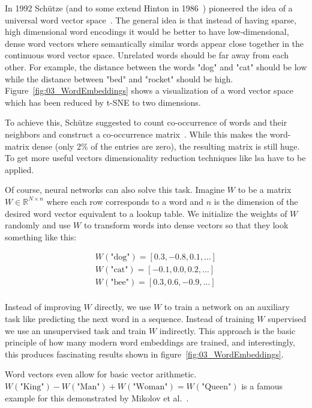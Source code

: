 In 1992 Schütze {(and to some extend Hinton in 1986~\cite{Hinton1986})} pioneered the idea of a universal word vector space~\cite{Schutze1992}. The general idea is that instead of having sparse, high dimensional word encodings it would be better to have low-dimensional, dense word vectors where semantically similar words appear close together in the continuous word vector space. Unrelated words should be far away from each other. For example, the distance between the words "dog" and "cat" should be low while the distance between "bed" and "rocket" should be high. Figure~\ref{fig:03_WordEmbeddings} shows a visualization of a word vector space which has been reduced by t-SNE to two dimensions.
\medskip

To achieve this, Schütze suggested to count co-occurrence of words and their neighbors and construct a co-occurrence matrix~\cite{Schutze1992}. While this makes the word-matrix dense {(only 2\% of the entries are zero)}, the resulting matrix is still huge. To get more useful vectors dimensionality reduction techniques like \gls{lsa} have to be applied.
\medskip

Of course, neural networks can also solve this task. Imagine $W$ to be a matrix $W \in \mathbb{R}^{N\times n}$ where each row corresponds to a word and $n$ is the dimension of the desired word vector equivalent to a lookup table. We initialize the weights of $W$ randomly and use $W$ to transform words into dense vectors so that they look something like this:

\begin{equation*}
    \begin{aligned}
        W(\text{"dog"}) = [0.3, -0.8, 0.1, \dots] \\
        W(\text{"cat"}) = [-0.1, 0.0, 0.2, \dots] \\
        W(\text{"bee"}) = [0.3, 0.6, -0.9, \dots] \\
    \end{aligned}
\end{equation*}

Instead of improving $W$ directly, we use $W$ to train a network on an auxiliary task like predicting the next word in a sequence. Instead of training $W$ supervised we use an unsupervised task and train $W$ indirectly. This approach is the basic principle of how many modern word embeddings are trained, and interestingly, this produces fascinating results shown in figure~\ref{fig:03_WordEmbeddings}.
\medskip

Word vectors even allow for basic vector arithmetic. $W(\text{"King"})-W(\text{"Man"})+W(\text{"Woman"})=W(\text{"Queen"})$ is a famous example for this demonstrated by Mikolov et al.~\cite{Mikolov2013d}.
\medskip

